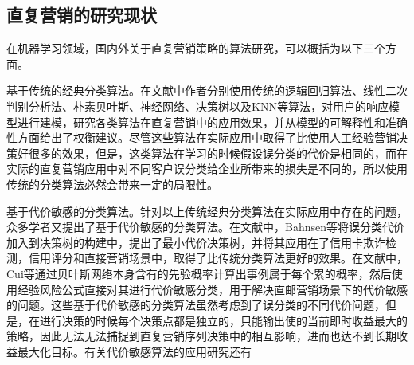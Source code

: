 \subsection{直复营销的研究现状}
在机器学习领域，国内外关于直复营销策略的算法研究，可以概括为以下三个方面。

基于传统的经典分类算法。在文献\citep{alam2012actionable, ngai2009application, wong2005mining, coussement2015improving}中作者分别使用传统的逻辑回归算法、线性二次判别分析法、朴素贝叶斯、神经网络、决策树以及KNN等算法，对用户的响应模型进行建模，研究各类算法在直复营销中的应用效果，并从模型的可解释性和准确性方面给出了权衡建议。尽管这些算法在实际应用中取得了比使用人工经验营销决策好很多的效果，但是，这类算法在学习的时候假设误分类的代价是相同的，而在实际的直复营销应用中对不同客户误分类给企业所带来的损失是不同的，所以使用传统的分类算法必然会带来一定的局限性。

基于代价敏感的分类算法。针对以上传统经典分类算法在实际应用中存在的问题，众多学者又提出了基于代价敏感的分类算法。在文献\citep{bahnsen2015example}中，Bahnsen等将误分类代价加入到决策树的构建中，提出了最小代价决策树，并将其应用在了信用卡欺诈检测，信用评分和直接营销场景中，取得了比传统分类算法更好的效果。在文献\citep{cui2012cost}中，Cui等通过贝叶斯网络本身含有的先验概率计算出事例属于每个累的概率，然后使用经验风险公式直接对其进行代价敏感分类，用于解决直邮营销场景下的代价敏感的问题。这些基于代价敏感的分类算法虽然考虑到了误分类的不同代价问题，但是，在进行决策的时候每个决策点都是独立的，只能输出使的当前即时收益最大的策略，因此无法无法捕捉到直复营销序列决策中的相互影响，进而也达不到长期收益最大化目标。有关代价敏感算法的应用研究还有\citep{migueis2017predicting,zakaryazad2016profit,hu2015cost}

